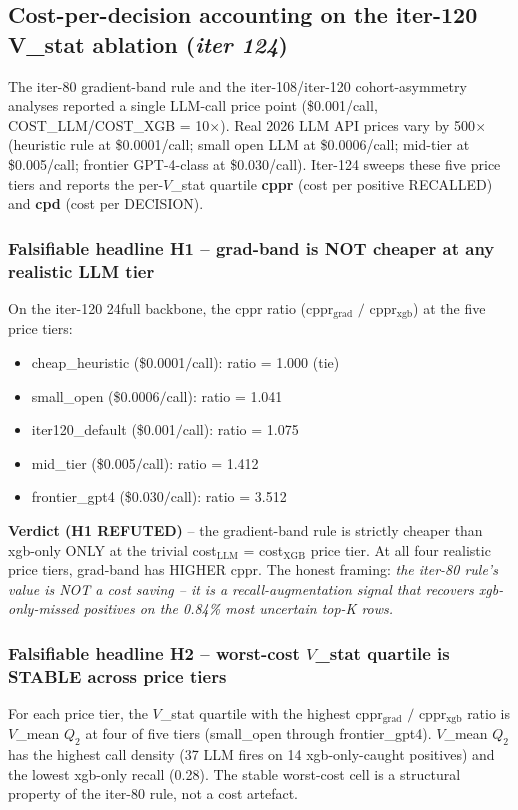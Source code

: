 \subsection{Cost-per-decision accounting on the iter-120 V\_stat ablation
  (\textit{iter 124})}
\label{sec:p8-iter124-cost-accounting}

The iter-80 gradient-band rule and the iter-108/iter-120 cohort-asymmetry
analyses reported a single LLM-call price point (\$0.001/call,
COST\_LLM/COST\_XGB = 10$\times$). Real 2026 LLM API prices vary by
500$\times$ (heuristic rule at \$0.0001/call; small open LLM at
\$0.0006/call; mid-tier at \$0.005/call; frontier GPT-4-class at
\$0.030/call).  Iter-124 sweeps these five price tiers and reports
the per-$V$\_stat quartile {\bf cppr} (cost per positive RECALLED) and
{\bf cpd} (cost per DECISION).

\subsubsection{Falsifiable headline H1 -- grad-band is NOT cheaper at any
  realistic LLM tier}
On the iter-120 24full backbone, the cppr ratio
(cppr$_{\text{grad}}$ $/$ cppr$_{\text{xgb}}$) at the five price tiers:
\begin{itemize}
\item cheap\_heuristic (\$0.0001$/$call): ratio = 1.000 (tie)
\item small\_open    (\$0.0006$/$call): ratio = 1.041
\item iter120\_default (\$0.001$/$call): ratio = 1.075
\item mid\_tier      (\$0.005$/$call):  ratio = 1.412
\item frontier\_gpt4 (\$0.030$/$call):  ratio = 3.512
\end{itemize}
\textbf{Verdict (H1 REFUTED)} -- the gradient-band rule is strictly
cheaper than xgb-only ONLY at the trivial cost$_{\text{LLM}}$ = cost$_{\text{XGB}}$
price tier.  At all four realistic price tiers, grad-band has HIGHER cppr.
The honest framing: \emph{the iter-80 rule's value is NOT a cost saving --
it is a recall-augmentation signal that recovers xgb-only-missed positives
on the 0.84\% most uncertain top-K rows.}

\subsubsection{Falsifiable headline H2 -- worst-cost $V$\_stat quartile is
  STABLE across price tiers}
For each price tier, the $V$\_stat quartile with the highest
cppr$_{\text{grad}}$ $/$ cppr$_{\text{xgb}}$ ratio is $V$\_mean $Q_2$ at
four of five tiers (small\_open through frontier\_gpt4).
$V$\_mean $Q_2$ has the highest call density (37 LLM fires on 14
xgb-only-caught positives) and the lowest xgb-only recall (0.28).
The stable worst-cost cell is a structural property of the iter-80
rule, not a cost artefact.


